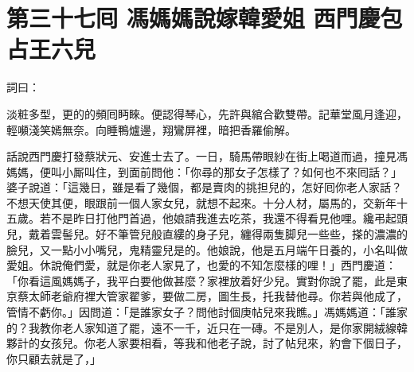 
\chapter*{第三十七囘 馮媽媽說嫁韓愛姐 西門慶包占王六兒}


詞曰：

\begin{myquote}
淡粧多型，更的的頻囘眄睞。便認得琴心，先許與綰合歡雙帶。記華堂風月逢迎，輕嚬淺笑嫣無奈。向睡鴨爐邊，翔鸞屏裡，暗把香羅偷解。

\end{myquote}

話說西門慶打發蔡狀元、安進士去了。一日，騎馬帶眼紗在街上喝道而過，撞見馮媽媽，便叫小厮叫住，到面前問他：「你尋的那女子怎樣了？如何也不來囘話？」婆子說道：「這幾日，雖是看了幾個，都是賣肉的挑担兒的，怎好囘你老人家話？不想天使其便，眼跟前一個人家女兒，就想不起來。十分人材，屬馬的，交新年十五歲。若不是昨日打他門首過，他娘請我進去吃茶，我還不得看見他哩。纔弔起頭兒，戴着雲髻兒。好不筆管兒般直縷的身子兒，纏得兩隻脚兒一些些，搽的濃濃的臉兒，又一點小小嘴兒，鬼精靈兒是的。他娘說，他是五月端午日養的，小名叫做愛姐。休說俺們愛，就是你老人家見了，也愛的不知怎麼樣的哩！」西門慶道：「你看這風媽媽子，我平白要他做甚麼？家裡放着好少兒。實對你說了罷，此是東京蔡太師老爺府裡大管家翟爹，要做二房，圖生長，托我替他尋。你若與他成了，管情不虧你。」因問道：「是誰家女子？問他討個庚帖兒來我瞧。」馮媽媽道：「誰家的？我教你老人家知道了罷，遠不一千，近只在一磚。不是別人，是你家開絨線韓夥計的女孩兒。你老人家要相看，等我和他老子說，討了帖兒來，約會下個日子，你只顧去就是了，」

